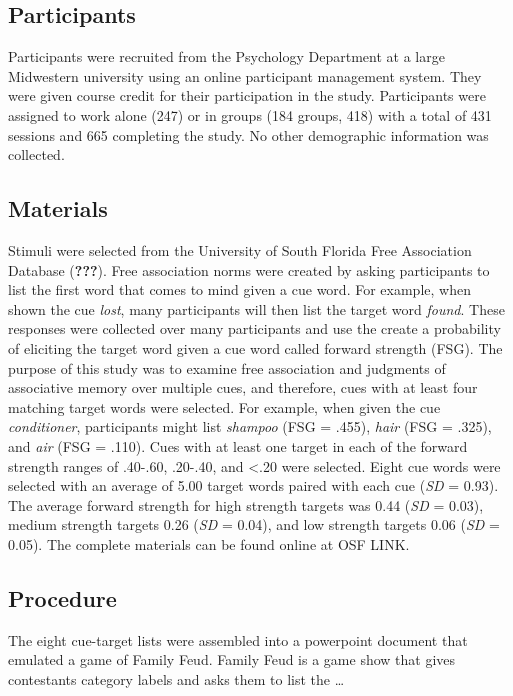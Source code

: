 \documentclass[man]{apa6}
\theoremstyle{definition}
\theoremstyle{definition}
\theoremstyle{definition}
\theoremstyle{remark}
\begin{document}
\subsection{Participants}\label{participants}

Participants were recruited from the Psychology Department at a large
Midwestern university using an online participant management system.
They were given course credit for their participation in the study.
Participants were assigned to work alone (247) or in groups (184 groups,
418) with a total of 431 sessions and 665 completing the study. No other
demographic information was collected.

\subsection{Materials}\label{materials}

Stimuli were selected from the University of South Florida Free
Association Database ({\textbf{???}}). Free association norms were
created by asking participants to list the first word that comes to mind
given a cue word. For example, when shown the cue \emph{lost}, many
participants will then list the target word \emph{found}. These
responses were collected over many participants and use the create a
probability of eliciting the target word given a cue word called forward
strength (FSG). The purpose of this study was to examine free
association and judgments of associative memory over multiple cues, and
therefore, cues with at least four matching target words were selected.
For example, when given the cue \emph{conditioner}, participants might
list \emph{shampoo} (FSG = .455), \emph{hair} (FSG = .325), and
\emph{air} (FSG = .110). Cues with at least one target in each of the
forward strength ranges of .40-.60, .20-.40, and \textless{}.20 were
selected. Eight cue words were selected with an average of 5.00 target
words paired with each cue (\emph{SD} = 0.93). The average forward
strength for high strength targets was 0.44 (\emph{SD} = 0.03), medium
strength targets 0.26 (\emph{SD} = 0.04), and low strength targets 0.06
(\emph{SD} = 0.05). The complete materials can be found online at OSF
LINK.

\subsection{Procedure}\label{procedure}

The eight cue-target lists were assembled into a powerpoint document
that emulated a game of Family Feud. Family Feud is a game show that
gives contestants category labels and asks them to list the \ldots{}
\end{document}
